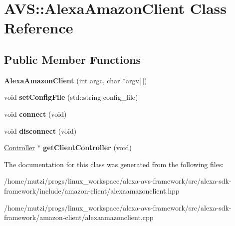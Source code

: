 \hypertarget{classAVS_1_1AlexaAmazonClient}{}\section{A\+VS\+:\+:Alexa\+Amazon\+Client Class Reference}
\label{classAVS_1_1AlexaAmazonClient}
\subsection*{Public Member Functions}
\begin{DoxyCompactItemize}
\item 
\mbox{\label{classAVS_1_1AlexaAmazonClient_a23e4eaff2f163a10ffeab366edc2d129}} 
{\bfseries Alexa\+Amazon\+Client} (int argc, char $\ast$argv\mbox{[}$\,$\mbox{]})
\item 
\mbox{\label{classAVS_1_1AlexaAmazonClient_a69a1f880f3bf52b3caa5482c52d424e1}} 
void {\bfseries set\+Config\+File} (std\+::string config\+\_\+file)
\item 
\mbox{\label{classAVS_1_1AlexaAmazonClient_a9fdbc4509001c991897eec28c577122c}} 
void {\bfseries connect} (void)
\item 
\mbox{\label{classAVS_1_1AlexaAmazonClient_a914fd2dc0d2d3c75fc8734472dd1bbd4}} 
void {\bfseries disconnect} (void)
\item 
\mbox{\label{classAVS_1_1AlexaAmazonClient_a737a57a29dba0ebe4885084a71a21c21}} 
\hyperlink{classAVS_1_1Controller}{Controller} $\ast$ {\bfseries get\+Client\+Controller} (void)
\end{DoxyCompactItemize}


The documentation for this class was generated from the following files\+:\begin{DoxyCompactItemize}
\item 
/home/mutzi/progs/linux\+\_\+workspace/alexa-\/avs-\/framework/src/alexa-\/sdk-\/framework/include/amazon-\/client/alexaamazonclient.\+hpp\item 
/home/mutzi/progs/linux\+\_\+workspace/alexa-\/avs-\/framework/src/alexa-\/sdk-\/framework/amazon-\/client/alexaamazonclient.\+cpp\end{DoxyCompactItemize}
